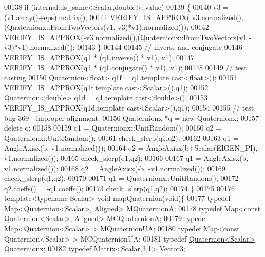 \begin{DoxyCode}
00138   \textcolor{keywordflow}{if} (internal::is\_same<Scalar,double>::value)
00139   \{
00140     v3 = (v1.array()+eps).matrix();
00141     VERIFY\_IS\_APPROX( v3.normalized(),(Quaternionx::FromTwoVectors(v1, v3)*v1).normalized());
00142     VERIFY\_IS\_APPROX(-v3.normalized(),(Quaternionx::FromTwoVectors(v1,-v3)*v1).normalized());
00143   \}
00144 
00145   \textcolor{comment}{// inverse and conjugate}
00146   VERIFY\_IS\_APPROX(q1 * (q1.inverse() * v1), v1);
00147   VERIFY\_IS\_APPROX(q1 * (q1.conjugate() * v1), v1);
00148 
00149   \textcolor{comment}{// test casting}
00150   \hyperlink{group___geometry___module_class_eigen_1_1_quaternion}{Quaternion<float>} q1f = q1.template cast<float>();
00151   VERIFY\_IS\_APPROX(q1f.template cast<Scalar>(),q1);
00152   \hyperlink{group___geometry___module_class_eigen_1_1_quaternion}{Quaternion<double>} q1d = q1.template cast<double>();
00153   VERIFY\_IS\_APPROX(q1d.template cast<Scalar>(),q1);
00154 
00155   \textcolor{comment}{// test bug 369 - improper alignment.}
00156   Quaternionx *q = \textcolor{keyword}{new} Quaternionx;
00157   \textcolor{keyword}{delete} q;
00158 
00159   q1 = Quaternionx::UnitRandom();
00160   q2 = Quaternionx::UnitRandom();
00161   check\_slerp(q1,q2);
00162 
00163   q1 = AngleAxisx(b, v1.normalized());
00164   q2 = AngleAxisx(b+Scalar(EIGEN\_PI), v1.normalized());
00165   check\_slerp(q1,q2);
00166 
00167   q1 = AngleAxisx(b,  v1.normalized());
00168   q2 = AngleAxisx(-b, -v1.normalized());
00169   check\_slerp(q1,q2);
00170 
00171   q1 = Quaternionx::UnitRandom();
00172   q2.coeffs() = -q1.coeffs();
00173   check\_slerp(q1,q2);
00174 \}
00175 
00176 \textcolor{keyword}{template}<\textcolor{keyword}{typename} Scalar> \textcolor{keywordtype}{void} mapQuaternion(\textcolor{keywordtype}{void})\{
00177   \textcolor{keyword}{typedef} \hyperlink{group___core___module_class_eigen_1_1_map}{Map<Quaternion<Scalar>}, \hyperlink{group__enums_gga45fe06e29902b7a2773de05ba27b47a1ad37d4c71425bb286e9b4103830538fbf}{Aligned}> MQuaternionA;
00178   \textcolor{keyword}{typedef} \hyperlink{group___core___module_class_eigen_1_1_map}{Map<const Quaternion<Scalar>}, \hyperlink{group__enums_gga45fe06e29902b7a2773de05ba27b47a1ad37d4c71425bb286e9b4103830538fbf}{Aligned}> MCQuaternionA;
00179   \textcolor{keyword}{typedef} Map<Quaternion<Scalar> > MQuaternionUA;
00180   \textcolor{keyword}{typedef} Map<const Quaternion<Scalar> > MCQuaternionUA;
00181   \textcolor{keyword}{typedef} \hyperlink{group___geometry___module_class_eigen_1_1_quaternion}{Quaternion<Scalar>} Quaternionx;
00182   \textcolor{keyword}{typedef} \hyperlink{group___core___module}{Matrix<Scalar,3,1>} Vector3;

\end{DoxyCode}
